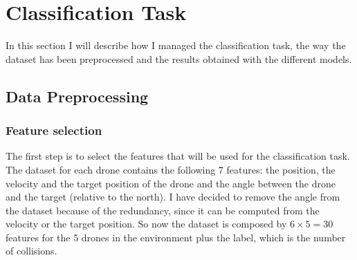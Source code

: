 \section{Classification Task} \label{sec:classification}
In this section I will describe how I managed the classification task, the way the dataset has been preprocessed and the results obtained with the different models.

\subsection{Data Preprocessing} \label{sec:preprocessing}

\subsubsection{Feature selection} \label{sec:preprocessing-feature-selection}
The first step is to select the features that will be used for the classification task.
The dataset for each drone contains the following 7 features: the position, the velocity and the target position of the drone and the angle between the drone and the target (relative to the north).
I have decided to remove the angle from the dataset because of the redundancy, since it can be computed from the velocity or the target position.
So now the dataset is composed by $6 \times 5 = 30$ features for the 5 drones in the environment plus the label, which is the number of collisions.

